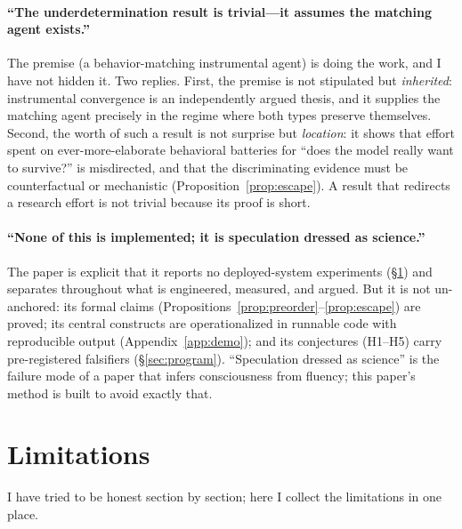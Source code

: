 \documentclass[11pt,a4paper]{article}
\theoremstyle{definition}
\begin{document}
\paragraph{``The underdetermination result is trivial---it assumes the matching agent exists.''} The premise (a behavior-matching instrumental agent) is doing the work, and I have not hidden it. Two replies. First, the premise is not stipulated but \emph{inherited}: instrumental convergence is an independently argued thesis, and it supplies the matching agent precisely in the regime where both types preserve themselves. Second, the worth of such a result is not surprise but \emph{location}: it shows that effort spent on ever-more-elaborate behavioral batteries for ``does the model really want to survive?'' is misdirected, and that the discriminating evidence must be counterfactual or mechanistic (Proposition~\ref{prop:escape}). A result that redirects a research effort is not trivial because its proof is short.

\paragraph{``None of this is implemented; it is speculation dressed as science.''} The paper is explicit that it reports no deployed-system experiments (\S\ref{sec:limitations}) and separates throughout what is engineered, measured, and argued. But it is not un-anchored: its formal claims (Propositions~\ref{prop:preorder}--\ref{prop:escape}) are proved; its central constructs are operationalized in runnable code with reproducible output (Appendix~\ref{app:demo}); and its conjectures (H1--H5) carry pre-registered falsifiers (\S\ref{sec:program}). ``Speculation dressed as science'' is the failure mode of a paper that infers consciousness from fluency; this paper's method is built to avoid exactly that.

\section{Limitations}
\label{sec:limitations}

I have tried to be honest section by section; here I collect the limitations in one place.
\end{document}
